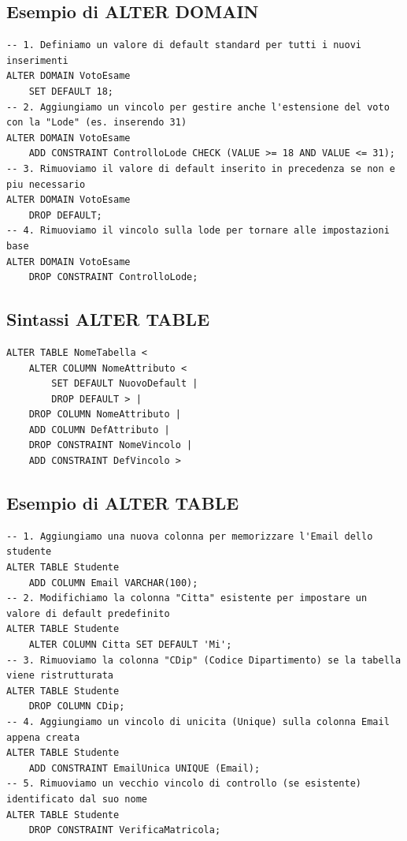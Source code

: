 \subsection{Esempio di ALTER DOMAIN}
\begin{lstlisting}[language=sql_generic]
-- 1. Definiamo un valore di default standard per tutti i nuovi inserimenti
ALTER DOMAIN VotoEsame 
    SET DEFAULT 18;
-- 2. Aggiungiamo un vincolo per gestire anche l'estensione del voto con la "Lode" (es. inserendo 31)
ALTER DOMAIN VotoEsame 
    ADD CONSTRAINT ControlloLode CHECK (VALUE >= 18 AND VALUE <= 31);
-- 3. Rimuoviamo il valore di default inserito in precedenza se non e piu necessario
ALTER DOMAIN VotoEsame 
    DROP DEFAULT;
-- 4. Rimuoviamo il vincolo sulla lode per tornare alle impostazioni base
ALTER DOMAIN VotoEsame 
    DROP CONSTRAINT ControlloLode;
\end{lstlisting}

\subsection{Sintassi ALTER TABLE}
\begin{lstlisting}[language=sql_generic]
ALTER TABLE NomeTabella <
    ALTER COLUMN NomeAttributo <
        SET DEFAULT NuovoDefault |
        DROP DEFAULT > |
    DROP COLUMN NomeAttributo |
    ADD COLUMN DefAttributo |
    DROP CONSTRAINT NomeVincolo |
    ADD CONSTRAINT DefVincolo >
\end{lstlisting}

\subsection{Esempio di ALTER TABLE}
\begin{lstlisting}[language=sql_generic]
-- 1. Aggiungiamo una nuova colonna per memorizzare l'Email dello studente
ALTER TABLE Studente 
    ADD COLUMN Email VARCHAR(100);
-- 2. Modifichiamo la colonna "Citta" esistente per impostare un valore di default predefinito
ALTER TABLE Studente 
    ALTER COLUMN Citta SET DEFAULT 'Mi';
-- 3. Rimuoviamo la colonna "CDip" (Codice Dipartimento) se la tabella viene ristrutturata
ALTER TABLE Studente 
    DROP COLUMN CDip;
-- 4. Aggiungiamo un vincolo di unicita (Unique) sulla colonna Email appena creata
ALTER TABLE Studente 
    ADD CONSTRAINT EmailUnica UNIQUE (Email);
-- 5. Rimuoviamo un vecchio vincolo di controllo (se esistente) identificato dal suo nome
ALTER TABLE Studente 
    DROP CONSTRAINT VerificaMatricola;
\end{lstlisting}

